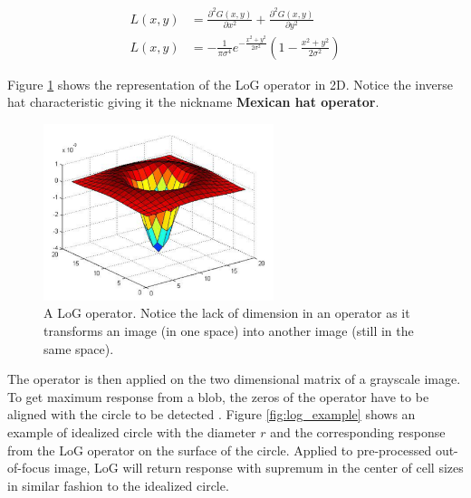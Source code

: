 \documentclass[pdftex,12pt,a4paper]{report}
\begin{document}
\begin{equation*}
\begin{aligned}
L(x, y) & = \frac{\partial^2 G(x, y)}{\partial x^2} + \frac{\partial^2 G(x, y)}{\partial y^2} \\ 
L(x, y) & = - \frac{1}{\pi \sigma^4} e^{-\frac{x^2 + y^2}{2\sigma^2}} \left( 1 - \frac{x^2 + y^2}{2 \sigma^2}\right)
\end{aligned}
\label{eq:log_2d_expansion}
\end{equation*}

Figure \ref{fig:log_operator} shows the representation of the LoG operator in 2D. Notice the inverse hat characteristic giving it the nickname \textbf{Mexican hat operator}.

\begin{figure}[H]
\centering
\includegraphics[width=0.6\textwidth]{images/log_operator}
\caption{A LoG operator. Notice the lack of dimension in an operator as it transforms an image (in one space) into another image (still in the same space).}
\label{fig:log_operator}
\end{figure}

The operator is then applied on the two dimensional matrix of a grayscale image. To get maximum response from a blob, the zeros of the operator have to be aligned with the circle to be detected \cite{marr1980theory}. Figure \ref{fig:log_example} shows an example of idealized circle with the diameter $r$ and the corresponding response from the LoG operator on the surface of the circle. Applied to pre-processed out-of-focus image, LoG will return response with supremum in the center of cell sizes in similar fashion to the idealized circle.
\end{document}
